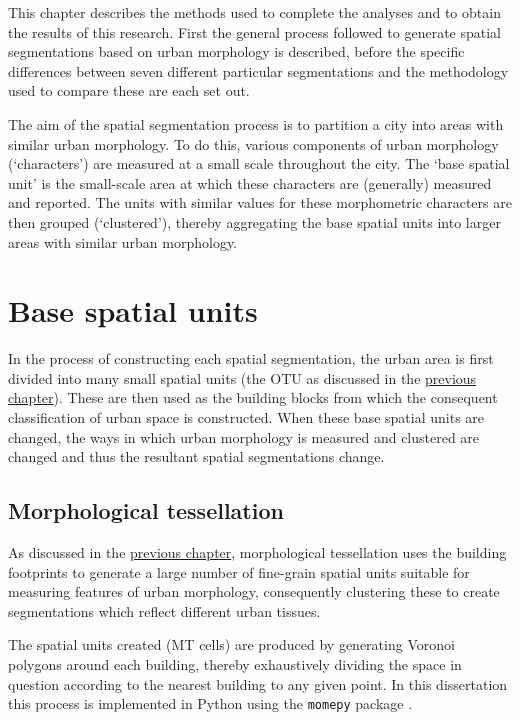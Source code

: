 \documentclass[a4paper, nobind]{templates/ociamthesis}
\begin{document}
\minitoc 

This chapter describes the methods used to complete the analyses and to obtain the results of this research. First the general process followed to generate spatial segmentations based on urban morphology is described, before the specific differences between seven different particular segmentations and the methodology used to compare these are each set out.

The aim of the spatial segmentation process is to partition a city into areas with similar urban morphology. To do this, various components of urban morphology (`characters') are measured at a small scale throughout the city. The `base spatial unit' is the small-scale area at which these characters are (generally) measured and reported. The units with similar values for these morphometric characters are then grouped (`clustered'), thereby aggregating the base spatial units into larger areas with similar urban morphology.

\hypertarget{base-spatial-units}{%
\section{Base spatial units}\label{base-spatial-units}}

In the process of constructing each spatial segmentation, the urban area is first divided into many small spatial units (the OTU as discussed in the \protect\hyperlink{spatial-unit}{previous chapter}). These are then used as the building blocks from which the consequent classification of urban space is constructed. When these base spatial units are changed, the ways in which urban morphology is measured and clustered are changed and thus the resultant spatial segmentations change.

\hypertarget{morphological-tessellation}{%
\subsection{Morphological tessellation}\label{morphological-tessellation}}

As discussed in the \protect\hyperlink{spatial-unit}{previous chapter}, morphological tessellation uses the building footprints to generate a large number of fine-grain spatial units suitable for measuring features of urban morphology, consequently clustering these to create segmentations which reflect different urban tissues.

The spatial units created (MT cells) are produced by generating Voronoi polygons around each building, thereby exhaustively dividing the space in question according to the nearest building to any given point. In this dissertation this process is implemented in Python using the \texttt{momepy} package \citep{fleischmann2019}.
\end{document}
